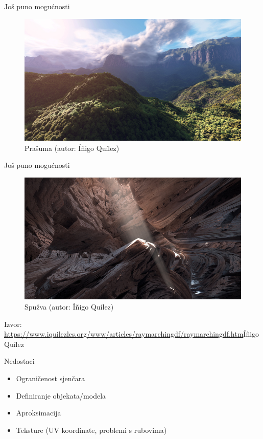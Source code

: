 \documentclass[12pt]{beamer}
\begin{document}
  \begin{frame}{Još puno mogućnosti}
    \begin{figure}
      \includegraphics[width=\textwidth,height=\textheight,keepaspectratio]{rainforest.jpg}
      \caption{Prašuma (autor: Íñigo Quílez)}
    \end{figure}
  \end{frame}

    \begin{frame}{Još puno mogućnosti}
    \begin{figure}
      \includegraphics[width=\textwidth,height=\textheight,keepaspectratio]{sponge.jpg}
      \caption{Spužva (autor: Íñigo Quílez)}
    \end{figure}
    Izvor: \href{https://www.iquilezles.org/www/articles/raymarchingdf/raymarchingdf.htm}{https://www.iquilezles.org/www/articles/raymarchingdf/raymarchingdf.htm}{Íñigo Quílez}
  \end{frame}

  \begin{frame}{Nedostaci}
    \begin{itemize}
    \item Ograničenost sjenčara
    \item Definiranje objekata/modela
    \item Aproksimacija
    \item Teksture (UV koordinate, problemi s rubovima)
    \end{itemize}
  \end{frame}
\end{document}
